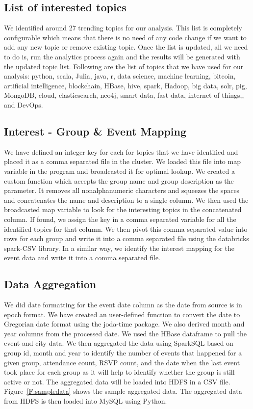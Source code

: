 \documentclass{acm_proc_article-sp}
\begin{document}
\subsection{List of interested topics}
We identified around 27 trending topics for our analysis. This list is completely configurable which means that there is no need of any code change if we want to add any new topic or remove existing topic.  Once the list is updated, all we need to do is, run the analytics process again and the results will be generated with the updated topic list.  Following are the list of topics that we have used for our analysis: python, scala, Julia, java, r, data science, machine learning, bitcoin, artificial intelligence, blockchain, HBase, hive, spark, Hadoop, big data, solr, pig, MongoDB, cloud, elasticsearch, neo4j, smart data, fast data, internet of things,, and DevOps.

\subsection{Interest - Group \& Event Mapping}
We have defined an integer key for each for topics that we have identified and placed it as a comma separated file in the cluster.  We loaded this file into map variable in the program and broadcasted it for optimal lookup.  We created a custom function which accepts the group name and group description as the parameter.  It removes all nonalphanumeric characters and squeezes the spaces and concatenates the name and description to a single column.  We then used the broadcasted map variable to look for the interesting topics in the concatenated column.  If found, we assign the key in a comma separated variable for all the identified topics for that column.  We then pivot this comma separated value into rows for each group and write it into a comma separated file using the databricks spark-CSV library.  In a similar way, we identify the interest mapping for the event data and write it into a comma separated file.

\subsection{Data Aggregation}
We did date formatting for the event date column as the date from source is in epoch format.  We have created an user-defined function to convert the date to Gregorian date format using the joda-time package.  We also derived month and year columns from the processed date.  We used the HBase dataframe to pull the event and city data.  We then aggregated the data using SparkSQL based on group id, month and year to identify the number of events that happened for a given group, attendance count, RSVP count, and the date when the last event took place for each group as it will help to identify whether the group is still active or not. The aggregated data will be loaded into HDFS in a CSV file.  Figure~\ref{F:sampledata} shows the sample aggregated data.  The aggregated data from HDFS is then loaded into MySQL using Python.
\end{document}
